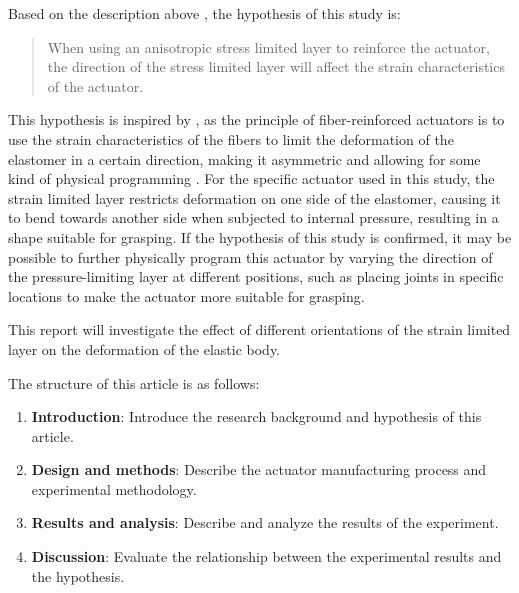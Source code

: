 \documentclass[conference]{IEEEtran}
\begin{document}

Based on the description above , the hypothesis of this study is:
\begin{quote}
When using an anisotropic stress limited layer to reinforce the actuator, the direction of the stress limited layer will affect the strain characteristics of the actuator.
\end{quote}


This hypothesis is inspired by \cite{mechanical_programing}, as the principle of fiber-reinforced actuators is to use the strain characteristics of the fibers to limit the deformation of the elastomer in a certain direction, making it asymmetric and allowing for some kind of physical programming \cite{fingerlike}. For the specific actuator used in this study, the strain limited layer restricts deformation on one side of the elastomer, causing it to bend towards another side when subjected to internal pressure, resulting in a shape suitable for grasping. If the hypothesis of this study is confirmed, it may be possible to further physically program this actuator by varying the direction of the pressure-limiting layer at different positions, such as placing joints in specific locations to make the actuator more suitable for grasping.


This report will investigate the effect of different orientations of the strain limited layer on the deformation of the elastic body.


The structure of this article is as follows:
\begin{enumerate}
    \item \textbf{Introduction}: Introduce the research background and hypothesis of this article.
    \item \textbf{Design and methods}: Describe the actuator manufacturing process and experimental methodology.
    \item \textbf{Results and analysis}: Describe and analyze the results of the experiment.
    \item \textbf{Discussion}: Evaluate the relationship between the experimental results and the hypothesis.
\end{enumerate}
\end{document}
